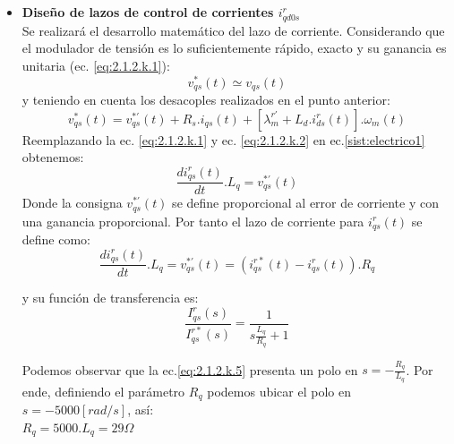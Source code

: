 \documentclass[10pt]{article}
\begin{document}
\begin{itemize}
\item \textbf{Diseño de lazos de control de corrientes $i^{r}_{qd0s}$}\\
Se realizará el desarrollo matemático del lazo de corriente. Considerando que el modulador de tensión es lo suficientemente rápido, exacto y su ganancia es unitaria (ec. \ref{eq:2.1.2.k.1}):
	\begin{equation}
	v^{*}_{qs}(t)\simeq v_{qs}(t)
	\label{eq:2.1.2.k.1}
	\end{equation}
y teniendo en cuenta los desacoples realizados en el punto anterior:
	\begin{equation}
	v^{*}_{qs}(t)= v^{*'}_{qs}(t) + R_{s}. i_{qs}(t) + [\lambda^{r'}_{m}+L_{d}.i^{r}_{ds}(t)].\omega_{m}(t)
	\label{eq:2.1.2.k.2}
	\end{equation}
Reemplazando la ec. \ref{eq:2.1.2.k.1} y ec. \ref{eq:2.1.2.k.2} en ec.\ref{sist:electrico1} obtenemos:
\begin{equation}
	\frac{di^{r}_{qs}(t)}{dt} . L_{q}= v^{*'}_{qs}(t)
	\label{eq:2.1.2.k.3}
	\end{equation}
	Donde la consigna $v^{*'}_{qs}(t)$ se define proporcional al error de corriente y con una ganancia proporcional. Por tanto el lazo de corriente para $i^{r}_{qs}(t)$ se define como:
	\begin{equation}
	\frac{di^{r}_{qs}(t)}{dt} . L_{q}= v^{*'}_{qs}(t)=(i^{r*}_{qs}(t)-i^{r}_{qs}(t)).R_{q}
	\label{eq:2.1.2.k.4}
	\end{equation}
	
	y su función de transferencia es:
		\begin{equation}
	\frac{I^{r}_{qs}(s)}{I^{r*}_{qs}(s)}=\frac{1}{s\frac{L_{q}}{R_{q}}+1}
	\label{eq:2.1.2.k.5}
	\end{equation}
	
	Podemos observar que la ec.\ref{eq:2.1.2.k.5} presenta un polo en $s=-\frac{R_{q}}{L_{q}}$. Por ende, definiendo el parámetro $R_{q}$ podemos ubicar el polo en $s=-5000[rad/s]$, así:\\
	$R_{q}=5000 . L_{q}=29\Omega$
	

\end{itemize}
\end{document}
